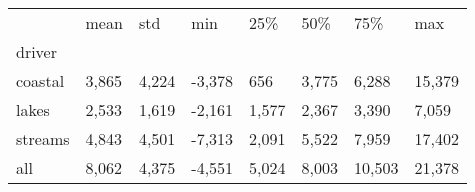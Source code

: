 \begin{tabular}{llllllll}
\toprule
 & mean & std & min & 25\% & 50\% & 75\% & max \\
driver &  &  &  &  &  &  &  \\
\midrule
coastal & 3,865 & 4,224 & -3,378 & 656 & 3,775 & 6,288 & 15,379 \\
lakes & 2,533 & 1,619 & -2,161 & 1,577 & 2,367 & 3,390 & 7,059 \\
streams & 4,843 & 4,501 & -7,313 & 2,091 & 5,522 & 7,959 & 17,402 \\
all & 8,062 & 4,375 & -4,551 & 5,024 & 8,003 & 10,503 & 21,378 \\
\bottomrule
\end{tabular}
